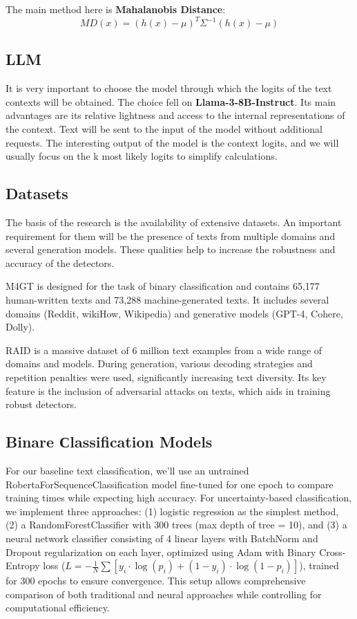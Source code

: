 \documentclass[a4paper, 12pt]{article}
\begin{document}
The main method here is \textbf{Mahalanobis Distance}:
$$MD(x) = (h(x) - \mu)^T \Sigma^{-1} (h(x) - \mu)$$

\subsection{LLM}

It is very important to choose the model through which the logits of the text contexts will be obtained. The choice fell on \textbf{Llama-3-8B-Instruct}. Its main advantages are its relative lightness and access to the internal representations of the context. Text will be sent to the input of the model without additional requests. The interesting output of the model is the context logits, and we will usually focus on the k most likely logits to simplify calculations.

\subsection{Datasets}

The basis of the research is the availability of extensive datasets. An important requirement for them will be the presence of texts from multiple domains and several generation models. These qualities help to increase the robustness and accuracy of the detectors.

M4GT\citep{wang2024m4gt} is designed for the task of binary classification and contains 65,177 human-written texts and 73,288 machine-generated texts. It includes several domains (Reddit, wikiHow, Wikipedia) and generative models (GPT-4, Cohere, Dolly).

RAID\citep{RAID} is a massive dataset of 6 million text examples from a wide range of domains and models. During generation, various decoding strategies and repetition penalties were used, significantly increasing text diversity. Its key feature is the inclusion of adversarial attacks on texts, which aids in training robust detectors.

\subsection{Binare Сlassification Models}

For our baseline text classification, we'll use an untrained RobertaForSequenceClassification model fine-tuned for one epoch to compare training times while expecting high accuracy. For uncertainty-based classification, we implement three approaches: (1) logistic regression as the simplest method, (2) a RandomForestClassifier with 300 trees (max depth of tree = 10), and (3) a neural network classifier consisting of 4 linear layers with BatchNorm and Dropout regularization on each layer, optimized using Adam with Binary Cross-Entropy loss ($L = -\frac{1}{N} \sum[y_i·\log(p_i) + (1-y_i)·\log(1-p_i)]$), trained for 300 epochs to ensure convergence. This setup allows comprehensive comparison of both traditional and neural approaches while controlling for computational efficiency.
\end{document}
